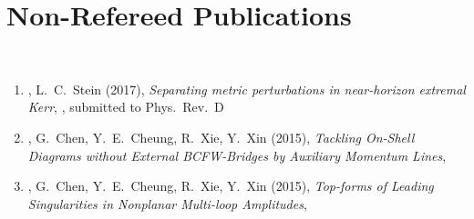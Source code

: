 \section*{\sc Non-Refereed Publications}~
\vspace{-.2in}

\begin{enumerate}
  \item
  \baoyi,
  L.~C.~Stein
  (2017),
  {\it Separating metric perturbations in near-horizon extremal Kerr},
  , submitted to Phys.~Rev.~D

  \item 
  \baoyi,
  G.~Chen,
  Y.~E.~Cheung,           
  R.~Xie,
  Y.~Xin
  (2015),
  {\it Tackling On-Shell Diagrams without External BCFW-Bridges by Auxiliary Momentum Lines},
 
  \item 
  \baoyi,
  G.~Chen,
  Y.~E.~Cheung,           
  R.~Xie,
  Y.~Xin
  (2015),
  {\it Top-forms of Leading Singularities in Nonplanar Multi-loop Amplitudes},








 \end{enumerate}

